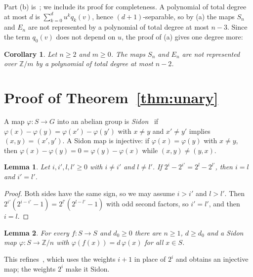 \documentclass[11pt]{article}
\newtheorem{lemma}{Lemma}
\newtheorem{corollary}{Corollary}
\theoremstyle{definition}
\newcommand{\Z}{\mathbb{Z}}
\begin{document}
Part (b) is~\cite[Theorem~5]{finbin}; we include its proof for completeness. A polynomial of
total degree at most $d$ is $\sum_{k=0}^{d}u^kq_k(v)$, hence $(d+1)$-separable, so by (a) the
maps $S_n$ and $E_n$ are not represented by a polynomial of total degree at most $n-3$. Since the
term $q_0(v)$ does not depend on $u$, the proof of (a) gives one degree more:

\begin{corollary}\label{cor:degree}
Let $n\ge 2$ and $m\ge 0$. The maps $S_n$ and $E_n$ are not represented over $\Z/m$ by a
polynomial of total degree at most $n-2$.
\end{corollary}

\section{Proof of Theorem~\ref{thm:unary}}

A map $\varphi\colon S\to G$ into an abelian group is \emph{Sidon}~\cite{obryant} if
$\varphi(x)-\varphi(y)=\varphi(x')-\varphi(y')$ with $x\ne y$ and $x'\ne y'$ implies
$(x,y)=(x',y')$. A Sidon map is injective: if $\varphi(x)=\varphi(y)$ with $x\ne y$, then
$\varphi(x)-\varphi(y)=0=\varphi(y)-\varphi(x)$ while $(x,y)\ne(y,x)$.

\begin{lemma}\label{lem:pow2}
Let $i,i',l,l'\ge 0$ with $i\ne i'$ and $l\ne l'$. If $2^i-2^{i'}=2^l-2^{l'}$, then $i=l$ and
$i'=l'$.
\end{lemma}

\begin{proof}
Both sides have the same sign, so we may assume $i>i'$ and $l>l'$. Then
$2^{i'}(2^{i-i'}-1)=2^{l'}(2^{l-l'}-1)$ with odd second factors, so $i'=l'$, and then $i=l$.
\end{proof}

\begin{lemma}\label{lem:sidon}
For every $f\colon S\to S$ and $d_0\ge 0$ there are $n\ge 1$, $d\ge d_0$ and a Sidon map
$\varphi\colon S\to\Z/n$ with $\varphi(f(x))=d\,\varphi(x)$ for all $x\in S$.
\end{lemma}

This refines~\cite[Lemma~2.12]{finlin}, which uses the weights $i+1$ in place of $2^i$ and
obtains an injective map; the weights $2^i$ make it Sidon.
\end{document}
